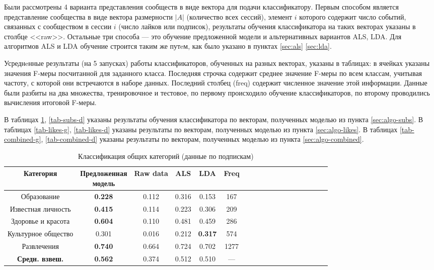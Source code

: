 \documentclass[times,specification,annotation]{itmo-student-thesis}
\begin{document}
Были рассмотрены 4 варианта представления сообществ в виде вектора для подачи классификатору. Первым способом является представление сообщества в виде вектора размерности $|A|$ (количество всех сессий), элемент $i$ которого содержит число событий, связанных с сообществом в сессии $i$ (число лайков или подписок), результаты обучения классификатора на таких векторах указаны в столбце <<raw>>. Остальные три способа --- это обучение предложенной модели и альтернативных вариантов ALS, LDA. Для алгоритмов ALS и LDA обучение строится таким же путeм, как было указано в пунктах \ref{sec:als} \ref{sec:lda}.  

Усреднeнные результаты (на 5 запусках) работы классификаторов, обученных на разных векторах, указаны в таблицах: в ячейках указаны значения F-меры посчитанной для заданного класса. Последняя строчка содержит среднее значение F-меры по всем классам, учитывая частоту, с которой они встречаются в наборе данных. Последний столбец (freq) содержит численное значение этой информации. Данные были разбиты на два множества, тренировочное и тестовое, по первому происходило обучение классификаторов, по второму проводились вычисления итоговой F-меры.

В таблицах \ref{tab-subs-g}, \ref{tab-subs-d} указаны результаты обучения классификатора по векторам, полученных моделью из пункта \ref{sec:algo-subs}. В таблицах \ref{tab-likes-g}, \ref{tab-likes-d} указаны результаты по векторам, полученных моделью из пункта \ref{sec:algo-likes}. В таблицах \ref{tab-combined-g}, \ref{tab-combined-d} указаны результаты по векторам, полученных моделью из пункта \ref{sec:algo-combined}. 

\begin{table}[!h]
\caption{Классификация общих категорий (данные по подпискам)}\label{tab-subs-g}
\centering
\begin{tabular}{|*{18}{c|}}\hline
    Категория & \thead{Предложенная \\ модель}  & Raw data & ALS & LDA & Freq \\\hline
Образование     & \textbf{0.228} & 0.112 & 0.316 & 0.153 & 167 \\\hline
Известная личность             & \textbf{0.415} & 0.114 & 0.223 & 0.306 & 209 \\\hline
Здоровье и красота             & \textbf{0.604} & 0.110 & 0.481 & 0.459 & 286 \\\hline
Культурное общество         & 0.301 & 0.016 & 0.212 & \textbf{0.317} & 574  \\\hline
Развлечения                           & \textbf{0.740} & 0.664 & 0.724 & 0.702 & 1277 \\\hline
\textbf{Средн. взвеш.}      & \textbf{0.562} & 0.374 & 0.512 & 0.510 & --- \\\hline
\end{tabular}
\end{table}
\end{document}
